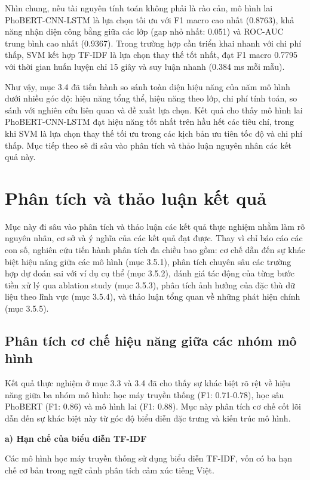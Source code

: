 \documentclass[14pt, a4paper]{report}
\begin{document}
Nhìn chung, nếu tài nguyên tính toán không phải là rào cản, mô hình lai PhoBERT-CNN-LSTM là lựa chọn tối ưu với F1 macro cao nhất (0.8763), khả năng nhận diện công bằng giữa các lớp (gap nhỏ nhất: 0.051) và ROC-AUC trung bình cao nhất (0.9367). Trong trường hợp cần triển khai nhanh với chi phí thấp, SVM kết hợp TF-IDF là lựa chọn thay thế tốt nhất, đạt F1 macro 0.7795 với thời gian huấn luyện chỉ 15 giây và suy luận nhanh (0.384 ms mỗi mẫu).


Như vậy, mục 3.4 đã tiến hành so sánh toàn diện hiệu năng của năm mô hình dưới nhiều góc độ: hiệu năng tổng thể, hiệu năng theo lớp, chi phí tính toán, so sánh với nghiên cứu liên quan và đề xuất lựa chọn. Kết quả cho thấy mô hình lai PhoBERT-CNN-LSTM đạt hiệu năng tốt nhất trên hầu hết các tiêu chí, trong khi SVM là lựa chọn thay thế tối ưu trong các kịch bản ưu tiên tốc độ và chi phí thấp. Mục tiếp theo sẽ đi sâu vào phân tích và thảo luận nguyên nhân các kết quả này.


\section{Phân tích và thảo luận kết quả}


Mục này đi sâu vào phân tích và thảo luận các kết quả thực nghiệm nhằm làm rõ nguyên nhân, cơ sở và ý nghĩa của các kết quả đạt được. Thay vì chỉ báo cáo các con số, nghiên cứu tiến hành phân tích đa chiều bao gồm: cơ chế dẫn đến sự khác biệt hiệu năng giữa các mô hình (mục 3.5.1), phân tích chuyên sâu các trường hợp dự đoán sai với ví dụ cụ thể (mục 3.5.2), đánh giá tác động của từng bước tiền xử lý qua ablation study (mục 3.5.3), phân tích ảnh hưởng của đặc thù dữ liệu theo lĩnh vực (mục 3.5.4), và thảo luận tổng quan về những phát hiện chính (mục 3.5.5).


\subsection{Phân tích cơ chế hiệu năng giữa các nhóm mô hình}


Kết quả thực nghiệm ở mục 3.3 và 3.4 đã cho thấy sự khác biệt rõ rệt về hiệu năng giữa ba nhóm mô hình: học máy truyền thống (F1: 0.71-0.78), học sâu PhoBERT (F1: 0.86) và mô hình lai (F1: 0.88). Mục này phân tích cơ chế cốt lõi dẫn đến sự khác biệt này từ góc độ biểu diễn đặc trưng và kiến trúc mô hình.


\textbf{a) Hạn chế của biểu diễn TF-IDF}


Các mô hình học máy truyền thống sử dụng biểu diễn TF-IDF, vốn có ba hạn chế cơ bản trong ngữ cảnh phân tích cảm xúc tiếng Việt.
\end{document}
